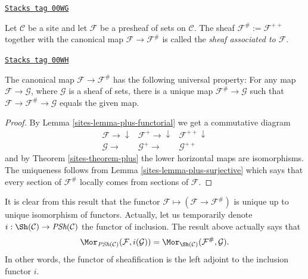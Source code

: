 \begin{definition}
\label{sites-definition-associated-sheaf}
\href{https://stacks.math.columbia.edu/tag/00WG}{\texttt{Stacks tag 00WG}}

Let $\mathcal{C}$ be a site and let $\mathcal{F}$ be a presheaf
of sets on $\mathcal{C}$. The sheaf $\mathcal{F}^\# := \mathcal{F}^{++}$
together with the canonical map $\mathcal{F} \to \mathcal{F}^\#$
is called the {\it sheaf associated to $\mathcal{F}$}.
\end{definition}

\begin{proposition}
\label{sites-proposition-sheafification-adjoint}
\href{https://stacks.math.columbia.edu/tag/00WH}{\texttt{Stacks tag 00WH}}

The canonical map $\mathcal{F} \to \mathcal{F}^\#$ has the
following universal property: For any map $\mathcal{F} \to \mathcal{G}$,
where $\mathcal{G}$ is a sheaf of sets, there is a unique map
$\mathcal{F}^\# \to \mathcal{G}$ such that $\mathcal{F} \to \mathcal{F}^\#
\to \mathcal{G}$ equals the given map.
\end{proposition}

\begin{proof}

By Lemma \ref{sites-lemma-plus-functorial} we get a commutative diagram
$$
\begin{array}{ccc}\mathcal{F} \longrightarrow\downarrow & \mathcal{F}^{+} \longrightarrow\downarrow & \mathcal{F}^{++} \downarrow \\ \mathcal{G} \longrightarrow & \mathcal{G}^{+} \longrightarrow & \mathcal{G}^{++}\end{array}
$$
and by Theorem \ref{sites-theorem-plus} the lower horizontal maps
are isomorphisms. The uniqueness follows from Lemma
\ref{sites-lemma-plus-surjective} which says that every section of
$\mathcal{F}^\#$ locally comes from sections of $\mathcal{F}$.
\end{proof}

It is clear from this result that the functor $\mathcal{F}
\mapsto (\mathcal{F} \to \mathcal{F}^\#)$ is unique
up to unique isomorphism of functors. Actually, let us temporarily
denote $i : \Sh(\mathcal{C}) \to \textit{PSh}(\mathcal{C})$
the functor of inclusion. The result above actually says that
$$
\Mor_{\textit{PSh}(\mathcal{C})}(\mathcal{F}, i(\mathcal{G}))
=
\Mor_{\Sh(\mathcal{C})}(\mathcal{F}^\#, \mathcal{G}).
$$
In other words, the functor of sheafification is the left adjoint
to the inclusion functor $i$.

